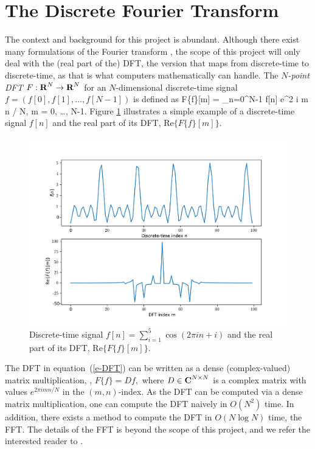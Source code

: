 \documentclass[12pt]{article}
\begin{document}
\section{The Discrete Fourier Transform}
The context and background for this project is abundant. Although there exist many formulations of the Fourier 
transform \cite{O:17}, the scope of this project will only deal with the (real part of the) DFT, the version that maps from 
discrete-time to discrete-time, as that is what computers mathematically can handle. The \emph{$N$-point DFT} 
$F: {\mbox{\bf R}}^N \rightarrow {\mbox{\bf R}}^N$ for an $N$-dimensional discrete-time signal \cite{B:78,O:17} 
$f = (f[0], f[1], \ldots, f[N-1])$ is defined as
\BEQ \label{e-DFT}
F\{f\}[m] = \sum_{n=0}^{N-1} f[n] e^{2 \pi i m n / N}, \quad m = 0, \ldots, N-1.
\EEQ
Figure \ref{f-example_DFT} illustrates a simple example of a discrete-time signal $f[n]$ and the real part 
of its DFT, Re$\{F\{f\}[m]\}$.

\begin{figure}
\centering
\includegraphics[scale=.5]{figures/DFT_example.png}
\caption{Discrete-time signal $f[n] = \sum_{i=1}^5 \cos(2 \pi i n + i)$ and 
the real part of its DFT, Re$\{F\{f\}[m]\}$.}
\label{f-example_DFT}
\end{figure}

The DFT in equation~(\ref{e-DFT}) can be written as a dense (complex-valued) matrix multiplication, \ie,
$F\{f\} = D f,$ where $D \in {\mbox{\bf C}}^{N \times N}$ is a complex matrix with values $e^{2 \pi i m n / N}$ in 
the $(m,n)$-index. As the DFT can be computed via a dense matrix multiplication, one can compute the DFT naively
in $O(N^2)$ time. In addition, there exists a method to compute the DFT in $O(N \log N)$ time, the FFT. The details 
of the FFT is beyond the scope of this project, and we refer the interested reader to \cite{CT:65}.
\end{document}
